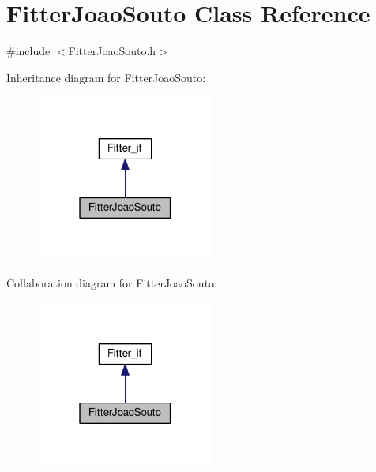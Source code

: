 \hypertarget{class_fitter_joao_souto}{\section{Fitter\-Joao\-Souto Class Reference}
\label{class_fitter_joao_souto}
}


{\ttfamily \#include $<$Fitter\-Joao\-Souto.\-h$>$}



Inheritance diagram for Fitter\-Joao\-Souto\-:\nopagebreak
\begin{figure}[H]
\begin{center}
\leavevmode
\includegraphics[width=166pt]{class_fitter_joao_souto__inherit__graph}
\end{center}
\end{figure}


Collaboration diagram for Fitter\-Joao\-Souto\-:\nopagebreak
\begin{figure}[H]
\begin{center}
\leavevmode
\includegraphics[width=166pt]{class_fitter_joao_souto__coll__graph}
\end{center}
\end{figure}
